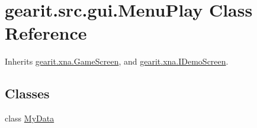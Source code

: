\hypertarget{classgearit_1_1src_1_1gui_1_1_menu_play}{\section{gearit.\+src.\+gui.\+Menu\+Play Class Reference}
\label{classgearit_1_1src_1_1gui_1_1_menu_play}
}


Inherits \hyperlink{classgearit_1_1xna_1_1_game_screen}{gearit.\+xna.\+Game\+Screen}, and \hyperlink{interfacegearit_1_1xna_1_1_i_demo_screen}{gearit.\+xna.\+I\+Demo\+Screen}.

\subsection*{Classes}
\begin{DoxyCompactItemize}
\item 
class \hyperlink{classgearit_1_1src_1_1gui_1_1_menu_play_1_1_my_data}{My\+Data}
\end{DoxyCompactItemize}
